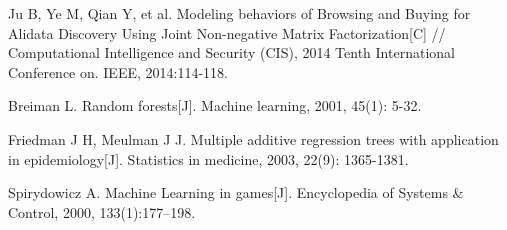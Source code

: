 \documentclass{llncs}
\begin{document}
\begin{thebibliography}{12}
	Ju B, Ye M, Qian Y, et al. Modeling behaviors of Browsing and Buying for Alidata Discovery Using Joint Non-negative Matrix Factorization[C]
	// Computational Intelligence and Security (CIS), 2014 Tenth International Conference on. IEEE, 2014:114-118.
	
	Breiman L. Random forests[J]. Machine learning, 2001, 45(1): 5-32.
	
	Friedman J H, Meulman J J. Multiple additive regression trees with application
	in epidemiology[J]. Statistics in medicine, 2003, 22(9): 1365-1381.
	
	Spirydowicz A. Machine Learning in games[J]. Encyclopedia of Systems \& Control, 2000, 133(1):177–198.
	
\end{thebibliography}
\end{document}
